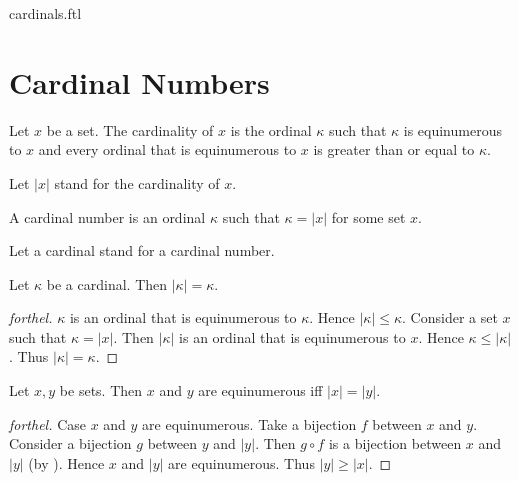 \documentclass{naproche-library}
\begin{document}
\begin{smodule}{cardinals.ftl}

  \section*{Cardinal Numbers}

  \begin{definition}[forthel,id=SET_THEORY_06_8286266038681600]
    Let $x$ be a set.
    The cardinality of $x$ is the ordinal $\kappa$ such that $\kappa$ is equinumerous to $x$ and every ordinal that is equinumerous to $x$ is greater than or equal to $\kappa$.

    Let $|x|$ stand for the cardinality of $x$.
  \end{definition}

  \begin{definition}[forthel,id=SET_THEORY_06_6818986081648640]
    A cardinal number is an ordinal $\kappa$ such that $\kappa = |x|$ for some
    set $x$.

    Let a cardinal stand for a cardinal number.
  \end{definition}

  \begin{proposition}[forthel,id=SET_THEORY_06_2820082336006144]
    Let $\kappa$ be a cardinal.
    Then $|\kappa| = \kappa$.
  \end{proposition}
  \begin{proof}[forthel]
    $\kappa$ is an ordinal that is equinumerous to $\kappa$.
    Hence $|\kappa| \leq \kappa$.
    Consider a set $x$ such that $\kappa = |x|$.
    Then $|\kappa|$ is an ordinal that is equinumerous to $x$.
    Hence $\kappa \leq |\kappa|$.
    Thus $|\kappa| = \kappa$.
  \end{proof}

  \begin{proposition}[forthel,id=SET_THEORY_06_6920913721229312]
    Let $x, y$ be sets.
    Then $x$ and $y$ are equinumerous iff $|x| = |y|$.
  \end{proposition}
  \begin{proof}[forthel]
    Case $x$ and $y$ are equinumerous.
      Take a bijection $f$ between $x$ and $y$.
      Consider a bijection $g$ between $y$ and $|y|$.
      Then $g \circ f$ is a bijection between $x$ and $|y|$ (by ).
      Hence $x$ and $|y|$ are equinumerous.
      Thus $|y| \geq |x|$.


\end{proof}
\end{smodule}
\end{document}
